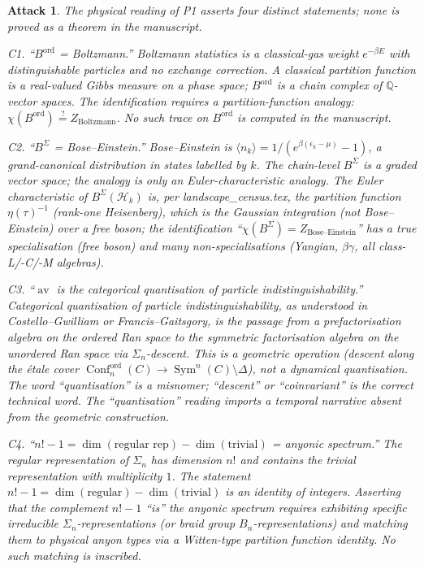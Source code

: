 \documentclass[11pt]{article}
\newtheorem*{attack}{Attack}
\theoremstyle{definition}
\DeclareMathOperator{\Conf}{Conf}
\DeclareMathOperator{\Sym}{Sym}
\DeclareMathOperator{\av}{av}
\newcommand{\ord}{\mathrm{ord}}
\begin{document}
\begin{attack}
The physical reading of P1 asserts four distinct statements; none is
proved as a theorem in the manuscript.

\emph{C1.} ``$B^{\ord}$ = Boltzmann.'' Boltzmann statistics is a
classical-gas weight $e^{-\beta E}$ with distinguishable particles and
no exchange correction. A classical partition function is a real-valued
Gibbs measure on a phase space; $B^{\ord}$ is a chain complex of
$\mathbb Q$-vector spaces. The identification requires a
partition-function analogy: $\chi(B^{\ord}) \stackrel{?}{=} Z_{\text{Boltzmann}}$.
No such trace on $B^{\ord}$ is computed in the manuscript.

\emph{C2.} ``$B^{\Sigma}$ = Bose--Einstein.'' Bose--Einstein is
$\langle n_k \rangle = 1/(e^{\beta(\epsilon_k - \mu)} - 1)$, a grand-canonical
distribution in states labelled by $k$. The chain-level $B^{\Sigma}$ is
a graded vector space; the analogy is only an Euler-characteristic
analogy. The Euler characteristic of $B^{\Sigma}(\mathcal H_k)$ is,
per landscape\_census.tex, the partition function $\eta(\tau)^{-1}$
(rank-one Heisenberg), which is the \emph{Gaussian} integration (not
Bose--Einstein) over a free boson; the identification
``$\chi(B^{\Sigma}) = Z_{\text{Bose--Einstein}}$'' has a true
specialisation (free boson) and many non-specialisations
(Yangian, $\beta\gamma$, all class-L/-C/-M algebras).

\emph{C3.} ``$\av$ is the categorical quantisation of particle
indistinguishability.'' Categorical quantisation of particle
indistinguishability, as understood in Costello--Gwilliam or
Francis--Gaitsgory, is the passage from a prefactorisation algebra on
the ordered Ran space to the symmetric factorisation algebra on the
unordered Ran space via $\Sigma_n$-descent. This is a geometric
operation (descent along the étale cover $\Conf_n^{\ord}(C) \to
\Sym^n(C) \setminus \Delta$), not a dynamical quantisation. The word
``quantisation'' is a misnomer; ``descent'' or ``coinvariant'' is the
correct technical word. The ``quantisation'' reading imports a temporal
narrative absent from the geometric construction.

\emph{C4.} ``$n! - 1 = \dim(\text{regular rep}) - \dim(\text{trivial})$
= anyonic spectrum.'' The regular representation of $\Sigma_n$ has
dimension $n!$ and contains the trivial representation with
multiplicity $1$. The statement $n! - 1 = \dim(\text{regular}) - \dim(\text{trivial})$
is an identity of integers. Asserting that the complement $n! - 1$ ``is''
the anyonic spectrum requires exhibiting specific irreducible
$\Sigma_n$-representations (or braid group $B_n$-representations) and
matching them to physical anyon types via a Witten-type partition
function identity. No such matching is inscribed.
\end{attack}
\end{document}
